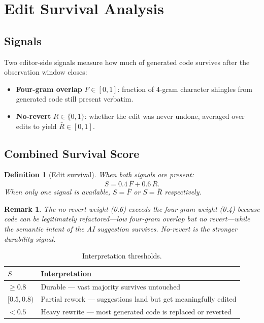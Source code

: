 \documentclass[11pt,a4paper]{article}
\newtheorem{definition}{Definition}
\newtheorem{remark}{Remark}
\begin{document}
\section{Edit Survival Analysis}
\label{sec:edit-survival}

\subsection{Signals}

Two editor-side signals measure how much of generated code survives after
the observation window closes:

\begin{itemize}
  \item \textbf{Four-gram overlap} $F \in [0,1]$: fraction of 4-gram character
        shingles from generated code still present verbatim.
  \item \textbf{No-revert} $R \in \{0,1\}$: whether the edit was never undone,
        averaged over edits to yield $\bar{R} \in [0,1]$.
\end{itemize}

\subsection{Combined Survival Score}

\begin{definition}[Edit survival]
When both signals are present:
\[
  \boxed{S = 0.4\,\bar{F} + 0.6\,\bar{R}.}
\]
When only one signal is available, $S = \bar{F}$ or $S = \bar{R}$ respectively.
\end{definition}

\begin{remark}
The no-revert weight (0.6) exceeds the four-gram weight (0.4) because code
can be legitimately \emph{refactored}---low four-gram overlap but no revert---while
the semantic intent of the AI suggestion survives.  No-revert is the stronger
durability signal.
\end{remark}

\begin{table}[h!]
\centering
\caption{Interpretation thresholds.}
\begin{tabular}{@{}ll@{}}
\toprule
$S$ & Interpretation \\
\midrule
$\geq 0.8$ & Durable --- vast majority survives untouched \\
$[0.5, 0.8)$ & Partial rework --- suggestions land but get meaningfully edited \\
$< 0.5$ & Heavy rewrite --- most generated code is replaced or reverted \\
\bottomrule
\end{tabular}
\end{table}
\end{document}
